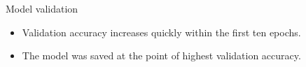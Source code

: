 \documentclass{beamer}
\begin{document}
\begin{frame}{Model validation}
\begin{itemize}
\item Validation accuracy increases quickly within the first ten epochs.
\item The model was saved at the point of highest validation accuracy.
\end{itemize}
\begin{figure}
\centering
\end{figure}
\end{frame}
\end{document}
